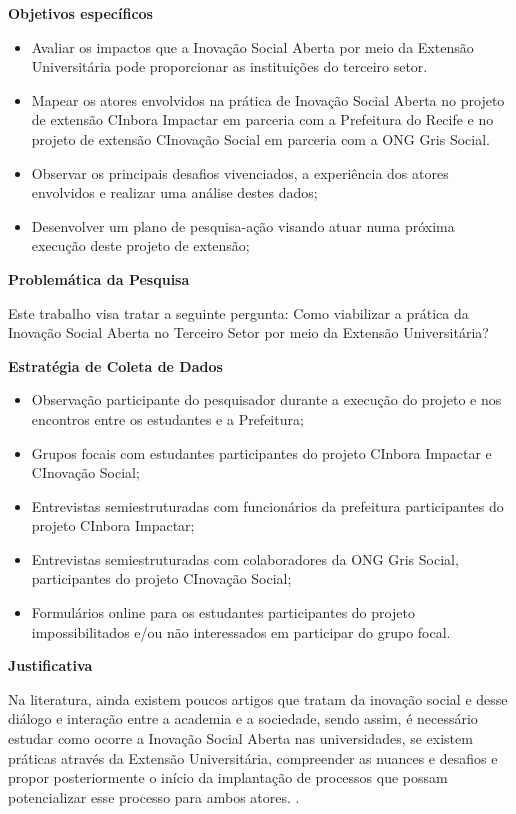\textbf{Objetivos específicos}
\begin{itemize}
    \item Avaliar os impactos que a Inovação Social Aberta por meio da Extensão Universitária pode proporcionar as instituições do terceiro setor.
    \item Mapear os atores envolvidos na prática de Inovação Social Aberta no projeto de extensão CInbora Impactar em parceria com a Prefeitura do Recife e no projeto de extensão CInovação Social em parceria com a \gls{ONG} Gris Social.
    \item Observar os principais desafios vivenciados, a experiência dos atores envolvidos e realizar uma análise destes dados;
    \item Desenvolver um plano de pesquisa-ação visando atuar numa próxima execução deste projeto de extensão;
\end{itemize}

\textbf{Problemática da Pesquisa}

Este trabalho visa tratar a seguinte pergunta: Como viabilizar a prática da Inovação Social Aberta no Terceiro Setor por meio da Extensão Universitária?


\textbf{Estratégia de Coleta de Dados}
\begin{itemize}
    \item Observação participante do pesquisador durante a execução do projeto e nos encontros entre os estudantes e a Prefeitura;
    \item Grupos focais com estudantes participantes do projeto CInbora Impactar e CInovação Social;
    \item Entrevistas semiestruturadas com funcionários da prefeitura participantes do projeto CInbora Impactar;
    \item Entrevistas semiestruturadas com colaboradores da \gls{ONG} Gris Social, participantes do projeto CInovação Social;
    \item Formulários online para os estudantes participantes do projeto impossibilitados e/ou não interessados em participar do grupo focal.
\end{itemize}

\textbf{Justificativa}


Na literatura, ainda existem poucos artigos que tratam da inovação social e desse diálogo e interação entre a academia e a sociedade, sendo assim, é necessário estudar como ocorre a Inovação Social Aberta nas universidades, se existem práticas através da Extensão Universitária, compreender as nuances e desafios e propor posteriormente o início da implantação de processos que possam potencializar esse processo para ambos atores. \cite{klaumann2023}.

